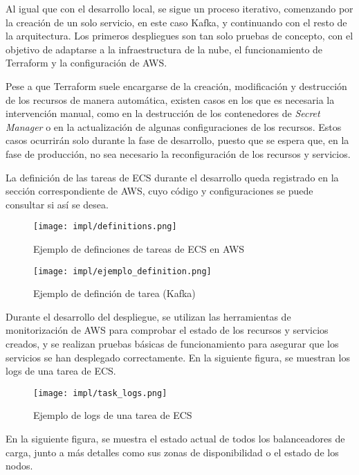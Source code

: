 Al igual que con el desarrollo local, se sigue un proceso iterativo, comenzando
por la creación de un solo servicio, en este caso Kafka, y continuando con el
resto de la arquitectura. Los primeros despliegues son tan solo pruebas de
concepto, con el objetivo de adaptarse a la infraestructura de la nube, el
funcionamiento de Terraform y la configuración de AWS.

Pese a que Terraform suele encargarse de la creación, modificación y destrucción
de los recursos de manera automática, existen casos en los que es necesaria la
intervención manual, como en la destrucción de los contenedores de
\textit{Secret Manager} o en la actualización de algunas configuraciones de los
recursos. Estos casos ocurrirán solo durante la fase de desarrollo, puesto que
se espera que, en la fase de producción, no sea necesario la reconfiguración de
los recursos y servicios.

La definición de las tareas de ECS durante el desarrollo queda registrado en la
sección correspondiente de AWS, cuyo código y configuraciones se puede consultar
si así se desea.

\begin{figure}[H]
	\centering
	\texttt{[image: impl/definitions.png]}
	\caption{Ejemplo de definciones de tareas de ECS en AWS}
	\label{fig:definitions}
\end{figure}

\begin{figure}[H]
	\centering
	\texttt{[image: impl/ejemplo\_definition.png]}
	\caption{Ejemplo de definción de tarea (Kafka)}
	\label{fig:definition}
\end{figure}

Durante el desarrollo del despliegue, se utilizan las herramientas de
monitorización de AWS para comprobar el estado de los recursos y servicios
creados, y se realizan pruebas básicas de funcionamiento para asegurar que los
servicios se han desplegado correctamente. En la siguiente figura, se muestran
los logs de una tarea de ECS.

\begin{figure}[H]
	\centering
	\texttt{[image: impl/task\_logs.png]}
	\caption{Ejemplo de logs de una tarea de ECS}
	\label{fig:task_logs}
\end{figure}

En la siguiente figura, se muestra el estado actual de todos los balanceadores
de carga, junto a más detalles como sus zonas de disponibilidad o el estado de
los nodos.

